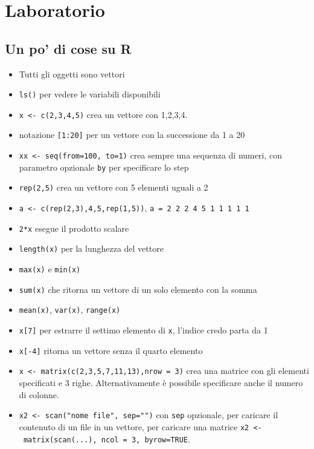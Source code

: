 \chapter{Laboratorio}

\section{Un po' di cose su R}\label{un-po-di-cose-su-r}

\begin{itemize}
\item
  Tutti gli oggetti sono vettori
\item
  \texttt{ls()} per vedere le variabili disponibili
\item
  \texttt{x\ \textless{}-\ c(2,3,4,5)} crea un vettore con 1,2,3,4.
\item
  notazione \texttt{{[}1:20{]}} per un vettore con la successione da 1 a
  20
\item
  \texttt{xx\ \textless{}-\ seq(from=100,\ to=1)} crea sempre una
  sequenza di numeri, con parametro opzionale \texttt{by} per
  specificare lo step
\item
  \texttt{rep(2,5)} crea un vettore con 5 elementi uguali a 2
\item
  \texttt{a\ \textless{}-\ c(rep(2,3),4,5,rep(1,5))},
  \texttt{a\ =\ 2\ 2\ 2\ 4\ 5\ 1\ 1\ 1\ 1\ 1}
\item
  \texttt{2*x} esegue il prodotto scalare
\item
  \texttt{length(x)} per la lunghezza del vettore
\item
  \texttt{max(x)} e \texttt{min(x)}
\item
  \texttt{sum(x)} che ritorna un vettore di un solo elemento con la
  somma
\item
  \texttt{mean(x)}, \texttt{var(x)}, \texttt{range(x)}
\item
  \texttt{x{[}7{]}} per estrarre il settimo elemento di \texttt{x},
  l'indice credo parta da 1
\item
  \texttt{x{[}-4{]}} ritorna un vettore senza il quarto elemento
\item
  \texttt{x\ \textless{}-\ matrix(c(2,3,5,7,11,13),nrow\ =\ 3)} crea una
  matrice con gli elementi specificati e 3 righe. Alternativamente è
  possibile specificare anche il numero di colonne.
\item
  \texttt{x2\ \textless{}-\ scan("nome\ file",\ sep="")} con
  \texttt{sep} opzionale, per caricare il contenuto di un file in un
  vettore, per caricare una matrice
  \texttt{x2\ \textless{}-\ matrix(scan(...),\ ncol\ =\ 3,\ byrow=TRUE}.

\end{itemize}
